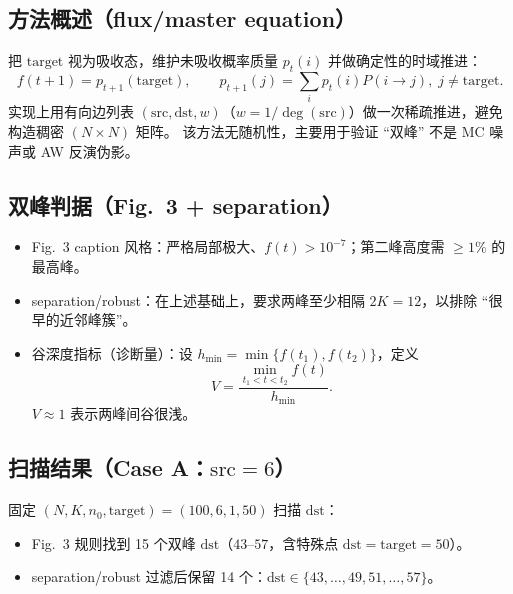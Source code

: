
\newcommand{\FluxCaseAFigDir}{figures/bimodality_flux_scan/N100K6_n0_1_target_50_src_6/latest}
\newcommand{\FluxCaseADataDir}{data/bimodality_flux_scan/N100K6_n0_1_target_50_src_6/latest}
\newcommand{\FluxCaseBFigDir}{figures/bimodality_flux_scan/N100K6_n0_1_target_50_src_1/latest}
\newcommand{\FluxCaseBDataDir}{data/bimodality_flux_scan/N100K6_n0_1_target_50_src_1/latest}

\subsection{方法概述（flux/master equation）}
把 $\mathrm{target}$ 视为吸收态，维护未吸收概率质量 $p_t(i)$ 并做确定性的时域推进：
\[
  f(t+1)=p_{t+1}(\mathrm{target}),\qquad
  p_{t+1}(j)=\sum_i p_t(i)P(i\to j),\; j\ne\mathrm{target}.
\]
实现上用有向边列表 $(\mathrm{src},\mathrm{dst},w)$（$w=1/\deg(\mathrm{src})$）做一次稀疏推进，避免构造稠密 $(N\times N)$ 矩阵。
该方法无随机性，主要用于验证 ``双峰'' 不是 MC 噪声或 AW 反演伪影。

\subsection{双峰判据（Fig.~3 + separation）}
\begin{itemize}
  \item Fig.~3 caption 风格：严格局部极大、$f(t)>10^{-7}$；第二峰高度需 $\ge 1\%$ 的最高峰。
  \item separation/robust：在上述基础上，要求两峰至少相隔 $2K=12$，以排除 ``很早的近邻峰簇''。
  \item 谷深度指标（诊断量）：设 $h_{\min}=\min\{f(t_1),f(t_2)\}$，定义
  \[
    V=\frac{\min_{t_1<t<t_2} f(t)}{h_{\min}}.
  \]
  $V\approx 1$ 表示两峰间谷很浅。
\end{itemize}

\subsection{扫描结果（Case A：$\mathrm{src}=6$）}
固定 $(N,K,n_0,\mathrm{target})=(100,6,1,50)$ 扫描 $\mathrm{dst}$：
\begin{itemize}
  \item Fig.~3 规则找到 15 个双峰 $\mathrm{dst}$（$43$--$57$，含特殊点 $\mathrm{dst}=\mathrm{target}=50$）。
  \item separation/robust 过滤后保留 14 个：$\mathrm{dst}\in\{43,\dots,49,51,\dots,57\}$。
\end{itemize}

